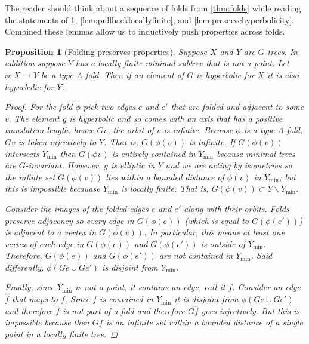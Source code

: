 \documentclass[12pt,parskip=full]{report}
\theoremstyle{plain}
\newtheorem{prop}[thm]{Proposition}
\theoremstyle{definition}
\begin{document}
The reader should think about a sequence of folds from \ref{thm:folds} while reading the statements of \ref{lem:foldingpreserveshyp}, \ref{lem:pullbacklocallyfinite}, and \ref{lem:preservehyperbolicity}. Combined these lemmas allow us to inductively push properties across folds.

\begin{prop}
    [Folding preserves properties]
    \label{lem:foldingpreserveshyp}
    Suppose $X$ and $Y$ are $G$-trees. In addition suppose $Y$ has a locally finite minimal subtree that is not a point. Let $\phi:X\to Y$ be a type A fold. Then if an element of $G$ is hyperbolic for $X$ it is also hyperbolic for $Y$.
    
    \begin{proof}
        For the fold $\phi$ pick two edges $e$ and $e'$ that are folded and adjacent to some $v$. The element $g$ is hyperbolic and so comes with an axis that has a positive translation length, hence $Gv$, the orbit of $v$ is infinite. Because $\phi$ is a type A fold, $G v$ is taken injectively to $Y$. That is, $G(\phi (v))$ is infinite. If $G(\phi (v))$ intersects $Y_\text{min}$ then $G(\phi v)$ is entirely contained in $Y_\text{min}$ because minimal trees are $G$-invariant. However, $g$ is elliptic in $Y$ and we are acting by isometries so the infinte set $G(\phi (v))$ lies within a bounded distance of $\phi (v)$ in $Y_\text{min}$; but this is impossible becauase $Y_\text{min}$ is locally finite. That is, $G(\phi (v))\subset Y\smallsetminus Y_\text{min}$. 
        
        Consider the images of the folded edges $e$ and $e'$ along with their orbits. 
        Folds preserve adjacency so every edge in $G(\phi (e))$ (which is equal to $G(\phi (e'))$) is adjacent to a vertex in $G( \phi (v))$. In particular, this means at least one vertex of each edge in $G(\phi (e))$ and $G(\phi (e'))$ is outside of $Y_\text{min}$. 
        Therefore, $G(\phi (e))$ and $G(\phi (e'))$ are not contained in $Y_\text{min}$. 
        Said differently, $\phi( Ge\cup Ge')$ is disjoint from $Y_\text{min}$.
        
        Finally, since $Y_\text{min}$ is not a point, it contains an edge, call it $f$. Consider an edge $\hat{f}$ that maps to $f$. Since $f$ is contained in $Y_\text{min}$ it is disjoint from $\phi( Ge\cup Ge')$ and therefore $\hat{f}$ is not part of a fold and therefore \(G\hat{f}\) goes injectively. But this is impossible because then $Gf$ is an infinite set within a bounded distance of a single point in a locally finite tree.
    \end{proof}
\end{prop}
\end{document}
